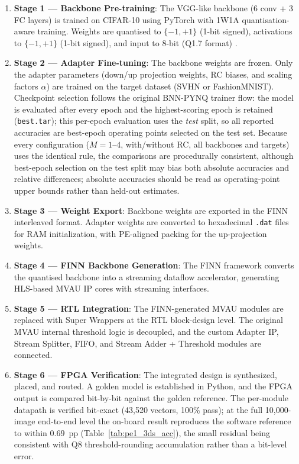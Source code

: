 \documentclass[12pt, a4paper]{report}
\numberwithin{equation}{chapter}
\numberwithin{figure}{chapter}
\numberwithin{table}{chapter}
\numberwithin{algorithm}{chapter}
\begin{document}
\begin{enumerate}
    \item \textbf{Stage 1 --- Backbone Pre-training}: The VGG-like backbone (6 conv + 3 FC layers) is trained on CIFAR-10 using PyTorch with 1W1A quantisation-aware training. Weights are quantised to $\{-1, +1\}$ (1-bit signed), activations to $\{-1, +1\}$ (1-bit signed), and input to 8-bit (Q1.7 format) \cite{Umuroglu2017FINN, Jacob2018Quantization}.

    \item \textbf{Stage 2 --- Adapter Fine-tuning}: The backbone weights are frozen. Only the adapter parameters (down/up projection weights, RC biases, and scaling factors $\alpha$) are trained on the target dataset (SVHN or FashionMNIST). Checkpoint selection follows the original BNN-PYNQ trainer flow: the model is evaluated after every epoch and the highest-scoring epoch is retained (\texttt{best.tar}); this per-epoch evaluation uses the \emph{test} split, so all reported accuracies are best-epoch operating points selected on the test set. Because every configuration ($M{=}1$--$4$, with/without RC, all backbones and targets) uses the identical rule, the comparisons are procedurally consistent, although best-epoch selection on the test split may bias both absolute accuracies and relative differences; absolute accuracies should be read as operating-point upper bounds rather than held-out estimates.

    \item \textbf{Stage 3 --- Weight Export}: Backbone weights are exported in the FINN interleaved format. Adapter weights are converted to hexadecimal \texttt{.dat} files for RAM initialization, with PE-aligned packing for the up-projection weights.

    \item \textbf{Stage 4 --- FINN Backbone Generation}: The FINN framework converts the quantised backbone into a streaming dataflow accelerator, generating HLS-based MVAU IP cores with streaming interfaces.

    \item \textbf{Stage 5 --- RTL Integration}: The FINN-generated MVAU modules are replaced with Super Wrappers at the RTL block-design level. The original MVAU internal threshold logic is decoupled, and the custom Adapter IP, Stream Splitter, FIFO, and Stream Adder + Threshold modules are connected.

    \item \textbf{Stage 6 --- FPGA Verification}: The integrated design is synthesized, placed, and routed. A golden model is established in Python, and the FPGA output is compared bit-by-bit against the golden reference. The per-module datapath is verified bit-exact (43{,}520 vectors, 100\% pass); at the full 10{,}000-image end-to-end level the on-board result reproduces the software reference to within $0.69$~pp (Table~\ref{tab:pe1_3ds_acc}), the small residual being consistent with Q8 threshold-rounding accumulation rather than a bit-level error.
\end{enumerate}
\end{document}
